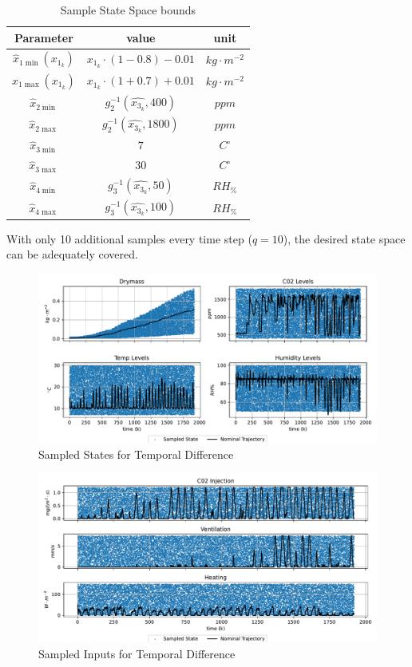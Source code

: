 \begin{table}[H]
    \centering
    \begin{tabular}{|c|c|c|}
    \hline
        Parameter& value& unit\\
        \hline
        $\hat{x}_{1\min}(x_{1_k})$ & $x_{1_k} \cdot (1-0.8) - 0.01 $ & $kg \cdot m^{-2}$\\
        $\hat{x}_{1\max}(x_{1_k})$ &$x_{1_k} \cdot (1+0.7) + 0.01 $ & $kg \cdot m^{-2}$\\
        $\hat{x}_{2\min}$ & $g_2^{-1} (\hat{x_{3_k}},400)$& $ppm$ \\
        $\hat{x}_{2\max}$ & $g_2^{-1} (\hat{x_{3_k}},1800)$& $ppm$ \\
        $\hat{x}_{3\min}$ &$7 $& $C^\circ$ \\
        $\hat{x}_{3\max}$ &$30$ &$C^\circ$\\
        $\hat{x}_{4\min}$ &$g_3^{-1} (\hat{x_{3_k}},50)$& $RH_{\%}$ \\
        $\hat{x}_{4\max}$ &$g_3^{-1} (\hat{x_{3_k}},100)$& $RH_{\%}$ \\
        \hline
    \end{tabular}
    \caption{Sample State Space bounds}
    \label{tab:sample_bounds_td}
\end{table}

With only 10 additional samples every time step ($q=10$), the desired state space can be adequately covered.

\begin{figure}[H]
	\centering
	\includegraphics[width = \textwidth]{figures/sampled_y_td.pdf}
	\caption{Sampled States for Temporal Difference}
	\label{fig:sampled-states-TD}
\end{figure}
\begin{figure}[H]
	\centering
	\includegraphics[width = \textwidth]{figures/sampled_u_td.pdf}
	\caption{Sampled Inputs for Temporal Difference}
	\label{fig:sampled-inpts-TD}
\end{figure}

